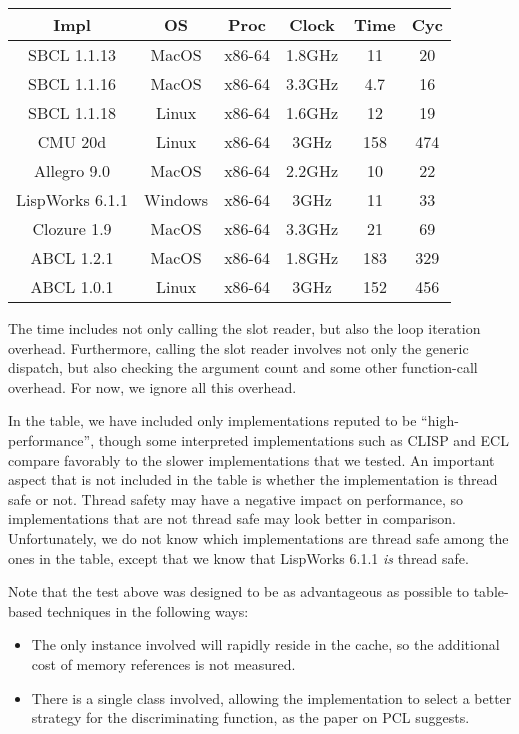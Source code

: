 {\small\begin{tabular}{|c|c|c|c|c|c|}
\hline
Impl & OS & Proc & Clock & Time & Cyc\\
\hline\hline
SBCL 1.1.13 & MacOS & x86-64 & 1.8GHz & 11 & 20 \\
SBCL 1.1.16 & MacOS & x86-64 & 3.3GHz & 4.7 & 16 \\
SBCL 1.1.18 & Linux & x86-64 & 1.6GHz & 12 & 19\\
CMU 20d & Linux & x86-64 & 3GHz & 158 & 474\\
Allegro 9.0 & MacOS & x86-64 & 2.2GHz & 10 & 22\\
LispWorks 6.1.1 & Windows & x86-64 & 3GHz & 11 & 33\\
Clozure 1.9 & MacOS & x86-64 & 3.3GHz & 21 & 69\\
ABCL 1.2.1 & MacOS & x86-64 & 1.8GHz & 183 & 329\\
ABCL 1.0.1 & Linux & x86-64 & 3GHz & 152 & 456\\
\hline
\end{tabular}}

The time includes not only calling the slot reader, but also the loop
iteration overhead.  Furthermore, calling the slot reader involves not
only the generic dispatch, but also checking the argument count and
some other function-call overhead.  For now, we ignore all this
overhead.

In the table, we have included only implementations reputed to be
``high-performance'', though some interpreted implementations such as
CLISP and ECL compare favorably to the slower implementations that we
tested.  An important aspect that is not included in the table is
whether the implementation is thread safe or not.  Thread safety may
have a negative impact on performance, so implementations that are not
thread safe may look better in comparison.  Unfortunately, we do not
know which implementations are thread safe among the ones in the
table, except that we know that LispWorks 6.1.1 \emph{is} thread
safe. 

Note that the test above was designed to be as advantageous as
possible to table-based techniques in the following ways:

\begin{itemize}
\item The only instance involved will rapidly reside in the cache, so
  the additional cost of memory references is not measured.
\item There is a single class involved, allowing the implementation to
  select a better strategy for the discriminating function, as the
  paper on PCL suggests. 
\end{itemize}

